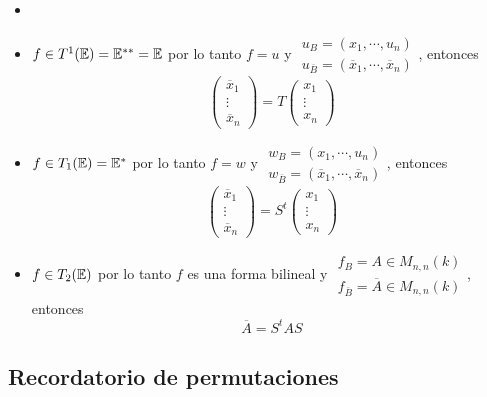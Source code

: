 \begin{example}
	\begin{itemize}
                \item []
		\item $f \in T^1(\mathbb{E}) = \mathbb{E}^{**} = \mathbb{E}$ por lo tanto $f = u$ y $\substack{
		u_B = (x_1, \cdots, u_n) \\ u_{\overline{B}} = (\overline{x}_1, \cdots,
		\overline{x}_n)}$, entonces
		\[
			\begin{pmatrix}
				\overline{x}_1 \\
				\vdots \\
				\overline{x}_n
			\end{pmatrix}
			= T \begin{pmatrix}
				x_1 \\
				\vdots \\
				x_n
			\end{pmatrix}
		\]
		\item $f \in T_1(\mathbb{E}) = \mathbb{E}^*$ por lo tanto $f = w$ y $\substack{
		w_B = (x_1, \cdots, u_n) \\ w_{\overline{B}} = (\overline{x}_1, \cdots,
		\overline{x}_n)}$, entonces
		\[
			\begin{pmatrix}
				\overline{x}_1 \\
				\vdots \\
				\overline{x}_n
			\end{pmatrix}
				= S^t \begin{pmatrix}
				x_1 \\
				\vdots \\
				x_n
			\end{pmatrix}
		\]
		\item $f \in T_2(\mathbb{E})$ por lo tanto $f$ es una forma bilineal y $\substack{
		f_B = A \in M_{n,n}(k) \\ f_{\overline{B}} = \overline{A} \in M_{n,n}(k)}$,
		entonces
		\[
			\overline{A} = S^tAS
		\]
	\end{itemize}
\end{example}
\subsection{Recordatorio de permutaciones}

